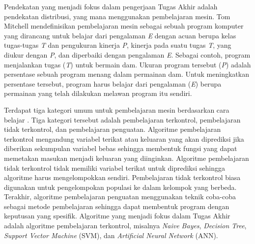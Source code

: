 Pendekatan yang menjadi fokus dalam pengerjaan Tugas Akhir adalah pendekatan distribusi, yang mana menggunakan pembelajaran mesin. Tom Mitchell \parencite{mitchell1997machine} mendefinisikan pembelajaran mesin sebagai sebuah program komputer yang dirancang untuk belajar dari pengalaman \textit{E} dengan acuan berupa kelas tugas-tugas \textit{T} dan pengukuran kinerja \textit{P}, kinerja pada suatu tugas \textit{T}, yang diukur dengan \textit{P}, dan diperbaiki dengan pengalaman \textit{E}. Sebagai contoh, program menjalankan tugas (\textit{T}) untuk bermain dam. Ukuran program tersebut (\textit{P}) adalah persentase sebuah program menang dalam permainan dam. Untuk meningkatkan persentase tersebut, program harus belajar dari pengalaman (\textit{E}) berupa permainan yang telah dilakukan melawan program itu sendiri.

Terdapat tiga kategori umum untuk pembelajaran mesin berdasarkan cara belajar \parencite{ray2015essentials}. Tiga kategori tersebut adalah pembelajaran terkontrol, pembelajaran tidak terkontrol, dan pembelajaran penguatan. Algoritme pembelajaran terkontrol mengandung variabel terikat atau keluaran yang akan diprediksi jika diberikan sekumpulan variabel bebas sehingga membentuk fungsi yang dapat memetakan masukan menjadi keluaran yang diinginkan. Algoritme pembelajaran tidak terkontrol tidak memiliki variabel terikat untuk diprediksi sehingga algoritme harus mengelompokkan sendiri. Pembelajaran tidak terkontrol biasa digunakan untuk pengelompokan populasi ke dalam kelompok yang berbeda. Terakhir, algoritme pembelajaran penguatan menggunakan teknik coba-coba sebagai metode pembelajaran sehingga dapat membentuk program dengan keputusan yang spesifik. Algoritme yang menjadi fokus dalam Tugas Akhir adalah algoritme pembelajaran terkontrol, misalnya \textit{Naive Bayes}, \textit{Decision Tree}, \textit{Support Vector Machine} (SVM), dan \textit{Artificial Neural Network} (ANN).

